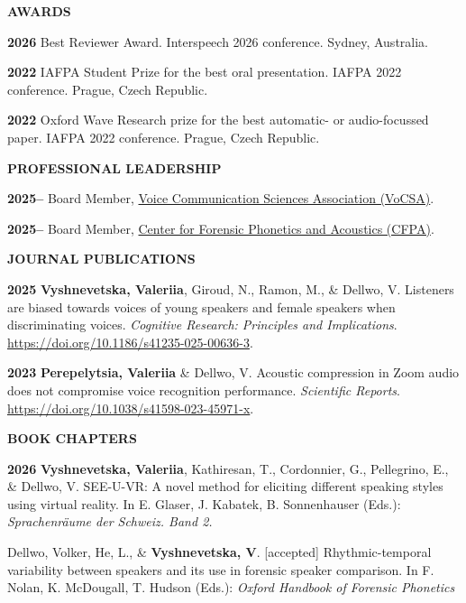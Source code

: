 \documentclass[11pt]{article}
\newcommand{\hangpara}{
 \setlength{\parindent}{0in} %
 \hangindent=0.42in %
}
\begin{document}
\vskip 20pt
\begin{flushleft}
{\bf AWARDS}
\end{flushleft}
\vskip 6pt
\hangpara
{\bf 2026}\hspace{1ex} Best Reviewer Award. Interspeech 2026 conference. Sydney, Australia.
\vskip 6pt
\hangpara
{\bf 2022}\hspace{1ex} IAFPA Student Prize for the best oral presentation. IAFPA 2022 conference. Prague, Czech Republic.
\vskip 6pt
\hangpara
{\bf 2022}\hspace{1ex} Oxford Wave Research prize for the best automatic- or audio-focussed paper. IAFPA 2022 conference. Prague, Czech Republic. %



\vskip 20pt
\begin{flushleft}
{\bf PROFESSIONAL LEADERSHIP}
\end{flushleft}
\vskip 6pt
\hangpara
{\bf 2025--}\hspace{1ex} Board Member, \href{https://www.vocsa.org/}{Voice Communication Sciences Association (VoCSA)}. 
\vskip 6pt
\hangpara
{\bf 2025--}\hspace{1ex} Board Member, \href{https://www.cl.uzh.ch/en/research-groups/phonetics/cfpa.html}{Center for Forensic Phonetics and Acoustics (CFPA)}.



\vskip 18pt
\begin{flushleft}
{\bf JOURNAL PUBLICATIONS}
\end{flushleft}
\vskip 6pt
\hangpara
{\bf 2025}\hspace{1ex} \textbf{Vyshnevetska, Valeriia}, Giroud, N., Ramon, M., \& Dellwo, V. Listeners are biased towards voices of young speakers and female speakers when discriminating voices. \textit{Cognitive Research: Principles and Implications}. \url{https://doi.org/10.1186/s41235-025-00636-3}.
\vskip 6pt
\hangpara
{\bf 2023}\hspace{1ex} \textbf{Perepelytsia, Valeriia} \& Dellwo, V. Acoustic compression in Zoom audio does not compromise voice recognition performance. \textit{Scientific Reports}. \url{https://doi.org/10.1038/s41598-023-45971-x}.

\vskip 20pt
\begin{flushleft}
{\bf BOOK CHAPTERS}
\end{flushleft}
\vskip 6pt
\hangpara
{\bf 2026}\hspace{1ex} \textbf{Vyshnevetska, Valeriia}, Kathiresan, T., Cordonnier, G., Pellegrino, E., \& Dellwo, V. SEE-U-VR: A novel method for eliciting different speaking styles  using virtual reality. In E. Glaser, J. Kabatek, B. Sonnenhauser (Eds.): \textit{Sprachenräume der Schweiz. Band 2.}
\vskip 6pt
\hangpara
Dellwo, Volker, He, L., \& \textbf{Vyshnevetska, V}. [accepted] Rhythmic-temporal variability between speakers and its use in forensic speaker comparison. In F. Nolan, K. McDougall, T. Hudson (Eds.): \textit{Oxford Handbook of Forensic Phonetics}
\end{document}
